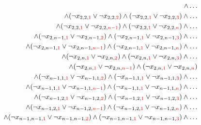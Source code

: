 \documentclass[11pt, a4paper]{article}
\begin{document}
\begin{align*}
		\wedge \dots \\
		\wedge
		(\neg x_{2,2,{\color{red} 1}} \vee \neg x_{2,2,{\color{red} 2}}) 
		\wedge 
		(\neg x_{2,2,{\color{red} 1}} \vee \neg x_{2,2,{\color{red} 3}})
		\wedge \dots \\
		\wedge
		(\neg x_{2,2,{\color{red} 1}} \vee \neg x_{2,2,{\color{red} n-1}})
		\wedge
		(\neg x_{2,2,{\color{red} 1}} \vee \neg x_{2,2,{\color{red} n}})
		\wedge \dots \\
		\wedge
		(\neg x_{2,n-1,{\color{red} 1}} \vee \neg x_{2,n-1,{\color{red} 2}}) 
		\wedge 
		(\neg x_{2,n-1,{\color{red} 1}} \vee \neg x_{2,n-1,{\color{red} 3}})
		\wedge \dots \\
		\wedge
		(\neg x_{2,n-1,{\color{red} 1}} \vee \neg x_{2,n-1,{\color{red} n-1}})
		\wedge
		(\neg x_{2,n-1,{\color{red} 1}} \vee \neg x_{2,n-1,{\color{red} n}})
		\wedge \dots \\
		\wedge
		(\neg x_{2,n,{\color{red} 1}} \vee \neg x_{2,n,{\color{red} 2}}) 
		\wedge 
		(\neg x_{2,n,{\color{red} 1}} \vee \neg x_{2,n,{\color{red} 3}})
		\wedge \dots \\
		\wedge
		(\neg x_{2,n,{\color{red} 1}} \vee \neg x_{2,n,{\color{red} n-1}})
		\wedge
		(\neg x_{2,n,{\color{red} 1}} \vee \neg x_{2,n,{\color{red} n}})
		\\
		\wedge (\neg x_{n-1,1,{\color{red} 1}} \vee \neg x_{n-1,1,{\color{red} 2}}) 
		\wedge 
		(\neg x_{n-1,1,{\color{red} 1}} \vee \neg x_{n-1,1,{\color{red} 3}})
		\wedge \dots \\
		\wedge
		(\neg x_{n-1,1,{\color{red} 1}} \vee \neg x_{n-1,1,{\color{red} n-1}})
		\wedge
		(\neg x_{n-1,1,{\color{red} 1}} \vee \neg x_{n-1,1,{\color{red} n}})
		\wedge \dots \\
		\wedge
		(\neg x_{n-1,2,{\color{red} 1}} \vee \neg x_{n-1,2,{\color{red} 2}}) 
		\wedge 
		(\neg x_{n-1,2,{\color{red} 1}} \vee \neg x_{n-1,2,{\color{red} 3}})
		\wedge \dots \\
		\wedge
		(\neg x_{n-1,2,{\color{red} 1}} \vee \neg x_{n-1,2,{\color{red} n-1}})
		\wedge
		(\neg x_{n-1,2,{\color{red} 1}} \vee \neg x_{n-1,2,{\color{red} n}})
		\wedge \dots \\
		\wedge
		(\neg x_{n-1,n-1,{\color{red} 1}} \vee \neg x_{n-1,n-1,{\color{red} 2}}) 
		\wedge 
		(\neg x_{n-1,n-1,{\color{red} 1}} \vee \neg x_{n-1,n-1,{\color{red} 3}})
		\wedge \dots \\

\end{align*}
\end{document}
